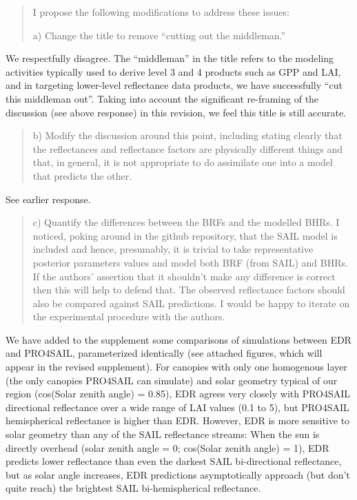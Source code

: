 
\begin{quote}
I propose the following modifications to address these issues:

a) Change the title to remove “cutting out the middleman.”
\end{quote}

We respectfully disagree. The “middleman” in the title refers to the modeling activities typically used to derive level 3 and 4 products such as GPP and LAI, and in targeting lower-level reflectance data products, we have successfully “cut this middleman out”. Taking into account the significant re-framing of the discussion (see above response) in this revision, we feel this title is still accurate.


\begin{quote}
b) Modify the discussion around this point, including stating clearly that the reflectances and reflectance factors are physically different things and that, in general, it is not appropriate to do assimilate one into a model that predicts the other.
\end{quote}

See earlier response.


\begin{quote}
c) Quantify the differences between the BRFs and the modelled BHRs. I noticed, poking around in the github repository, that the SAIL model is included and hence, presumably, it is trivial to take representative posterior parameters values and model both BRF (from SAIL) and BHRs. If the authors’ assertion that it shouldn’t make any difference is correct then this will help to defend that. The observed reflectance factors should also be compared against SAIL predictions. I would be happy to iterate on the experimental procedure with the authors.
\end{quote}

We have added to the supplement some comparisons of simulations between EDR and PRO4SAIL, parameterized identically (see attached figures, which will appear in the revised supplement). For canopies with only one homogenous layer (the only canopies PRO4SAIL can simulate) and solar geometry typical of our region (cos(Solar zenith angle) = 0.85), EDR agrees very closely with PRO4SAIL directional reflectance over a wide range of LAI values (0.1 to 5), but PRO4SAIL hemispherical reflectance is higher than EDR. However, EDR is more sensitive to solar geometry than any of the SAIL reflectance streams: When the sun is directly overhead (solar zenith angle = 0; cos(Solar zenith angle) = 1), EDR predicts lower reflectance than even the darkest SAIL bi-directional reflectance, but as solar angle increases, EDR predictions asymptotically approach (but don’t quite reach) the brightest SAIL bi-hemispherical reflectance.

